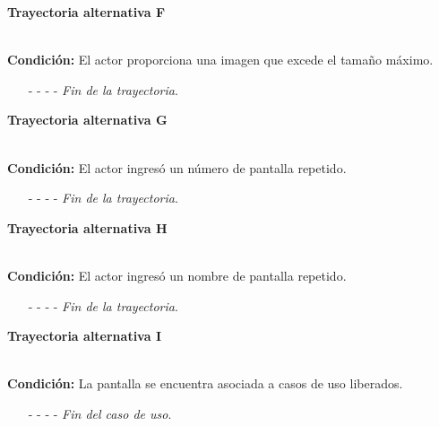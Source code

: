 \hypertarget{CU11-2:TAF}{\textbf{Trayectoria alternativa F}}\\
\noindent \textbf{Condición:} El actor proporciona una imagen que excede el tamaño máximo.
\begin{enumerate}
	\UCpaso[\UCsist] Muestra el mensaje  señalando el campo que presenta el error en la pantalla .
	\UCpaso Regresa al paso \ref{CU11.2-P6} de la trayectoria principal.
	\item[- -] - - {\em {Fin de la trayectoria}}.
\end{enumerate}

\hypertarget{CU11-2:TAG}{\textbf{Trayectoria alternativa G}}\\
\noindent \textbf{Condición:} El actor ingresó un número de pantalla repetido.
\begin{enumerate}
	\UCpaso[\UCsist] Muestra el mensaje  señalando el campo que presenta la duplicidad en la pantalla .
	\UCpaso Regresa al paso \ref{CU11.2-P5} de la trayectoria principal.
	\item[- -] - - {\em {Fin de la trayectoria}}.
\end{enumerate}
\hypertarget{CU11-2:TAH}{\textbf{Trayectoria alternativa H}}\\
\noindent \textbf{Condición:} El actor ingresó un nombre de pantalla repetido.
\begin{enumerate}
	\UCpaso[\UCsist] Muestra el mensaje  señalando el campo que presenta la duplicidad en la pantalla .
	\UCpaso Regresa al paso \ref{CU11.2-P5} de la trayectoria principal.
	\item[- -] - - {\em {Fin de la trayectoria}}.
\end{enumerate}
\hypertarget{CU11-2:TAG}{\textbf{Trayectoria alternativa I}}\\
\noindent \textbf{Condición:} La pantalla se encuentra asociada a casos de uso liberados.
\begin{enumerate}
	\UCpaso[\UCsist] Oculta el botón \editar de la pantalla que esta asociada a casos de uso liberados.
	\item[- -] - - {\em {Fin del caso de uso}}.
\end{enumerate}

